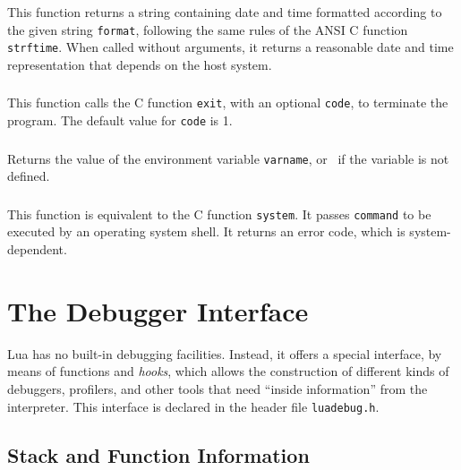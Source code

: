 \subsubsection*{}

This function returns a string containing date and time
formatted according to the given string \verb'format',
following the same rules of the ANSI C function \verb'strftime'.
When called without arguments,
it returns a reasonable date and time representation that depends on
the host system.

\subsubsection*{}

This function calls the C function \verb-exit-,
with an optional \verb-code-,
to terminate the program.
The default value for \verb-code- is 1.

\subsubsection*{}

Returns the value of the environment variable \verb|varname|,
or \nil\ if the variable is not defined.

\subsubsection*{}

This function is equivalent to the C function \verb|system|.
It passes \verb|command| to be executed by an operating system shell.
It returns an error code, which is system-dependent.


\section{The Debugger Interface} \label{debugI}

Lua has no built-in debugging facilities.
Instead, it offers a special interface,
by means of functions and {\em hooks},
which allows the construction of different
kinds of debuggers, profilers, and other tools
that need ``inside information'' from the interpreter.
This interface is declared in the header file \verb'luadebug.h'.

\subsection{Stack and Function Information}

